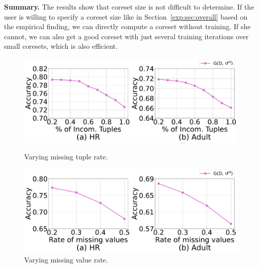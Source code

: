 \noindent \textbf{Summary.} The results show that coreset size is not difficult to determine. If the user is willing to specify a coreset size like in Section~\ref{exp:sec:overall} based on the empirical finding, we can directly compute a coreset without training. If she cannot, we can also get a good coreset with just several training iterations over small coresets, which is also efficient.
 
\begin{figure}   
	\centering
	\begin{minipage}[t]{0.49\textwidth}
		\centering
		\includegraphics[width=\textwidth]{figs/missingrate_all}
        \caption{Varying missing tuple rate.}
        \label{fig:vary_misstuple_all}
	\end{minipage}
	\begin{minipage}[t]{0.49\textwidth}
		\centering
		\includegraphics[width=\textwidth]{figs/missingrate_real}
        \caption{Varying missing value rate.}
        \label{fig:realmissrate}
	\end{minipage}  
\end{figure}

